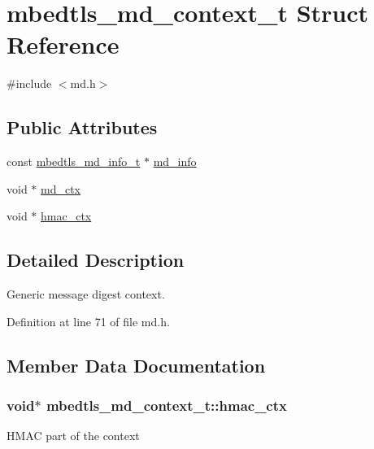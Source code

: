 \hypertarget{structmbedtls__md__context__t}{\section{mbedtls\-\_\-md\-\_\-context\-\_\-t Struct Reference}
\label{structmbedtls__md__context__t}
}


{\ttfamily \#include $<$md.\-h$>$}

\subsection*{Public Attributes}
\begin{DoxyCompactItemize}
\item 
const \hyperlink{structmbedtls__md__info__t}{mbedtls\-\_\-md\-\_\-info\-\_\-t} $\ast$ \hyperlink{structmbedtls__md__context__t_a946ec8104697a039cf1990233cd41b28}{md\-\_\-info}
\item 
void $\ast$ \hyperlink{structmbedtls__md__context__t_af7dc1e93cbd6f9a3c52d1a5064732fe1}{md\-\_\-ctx}
\item 
void $\ast$ \hyperlink{structmbedtls__md__context__t_aabd68159641f26735e93b0b002d9ddce}{hmac\-\_\-ctx}
\end{DoxyCompactItemize}


\subsection{Detailed Description}
Generic message digest context. 

Definition at line 71 of file md.\-h.



\subsection{Member Data Documentation}
\hypertarget{structmbedtls__md__context__t_aabd68159641f26735e93b0b002d9ddce}{
\subsubsection[{hmac\-\_\-ctx}]{\setlength{\rightskip}{0pt plus 5cm}void$\ast$ mbedtls\-\_\-md\-\_\-context\-\_\-t\-::hmac\-\_\-ctx}}\label{structmbedtls__md__context__t_aabd68159641f26735e93b0b002d9ddce}
H\-M\-A\-C part of the context 

